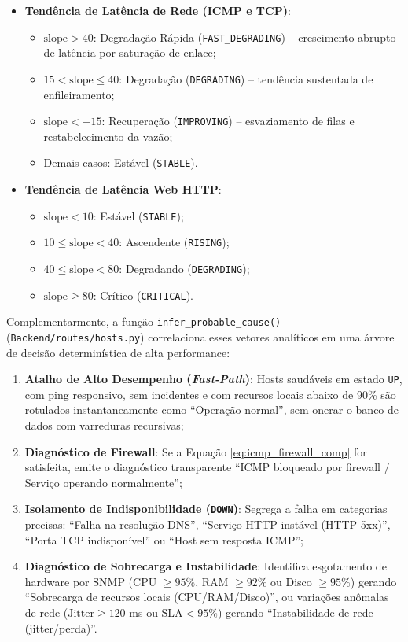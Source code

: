 \documentclass[12pt,a4paper]{article}
\begin{document}
\begin{itemize}[leftmargin=1.25cm]
\item \textbf{Tendência de Latência de Rede (ICMP e TCP)}:
  \begin{itemize}
  \item $\text{slope} > 40$: Degradação Rápida (\texttt{FAST\_DEGRADING}) -- crescimento abrupto de latência por saturação de enlace;
  \item $15 < \text{slope} \le 40$: Degradação (\texttt{DEGRADING}) -- tendência sustentada de enfileiramento;
  \item $\text{slope} < -15$: Recuperação (\texttt{IMPROVING}) -- esvaziamento de filas e restabelecimento da vazão;
  \item Demais casos: Estável (\texttt{STABLE}).
  \end{itemize}
\item \textbf{Tendência de Latência Web HTTP}:
  \begin{itemize}
  \item $\text{slope} < 10$: Estável (\texttt{STABLE});
  \item $10 \le \text{slope} < 40$: Ascendente (\texttt{RISING});
  \item $40 \le \text{slope} < 80$: Degradando (\texttt{DEGRADING});
  \item $\text{slope} \ge 80$: Crítico (\texttt{CRITICAL}).
  \end{itemize}
\end{itemize}

Complementarmente, a função \texttt{infer\_probable\_cause()} (\texttt{Backend/routes/hosts.py}) correlaciona esses vetores analíticos em uma árvore de decisão determinística de alta performance:
\begin{enumerate}[leftmargin=1.25cm]
\item \textbf{Atalho de Alto Desempenho (\textit{Fast-Path})}: Hosts saudáveis em estado \texttt{UP}, com ping responsivo, sem incidentes e com recursos locais abaixo de 90\% são rotulados instantaneamente como ``Operação normal'', sem onerar o banco de dados com varreduras recursivas;
\item \textbf{Diagnóstico de Firewall}: Se a Equação \ref{eq:icmp_firewall_comp} for satisfeita, emite o diagnóstico transparente ``ICMP bloqueado por firewall / Serviço operando normalmente'';
\item \textbf{Isolamento de Indisponibilidade (\texttt{DOWN})}: Segrega a falha em categorias precisas: ``Falha na resolução DNS'', ``Serviço HTTP instável (HTTP 5xx)'', ``Porta TCP indisponível'' ou ``Host sem resposta ICMP'';
\item \textbf{Diagnóstico de Sobrecarga e Instabilidade}: Identifica esgotamento de hardware por SNMP (CPU $\ge 95\%$, RAM $\ge 92\%$ ou Disco $\ge 95\%$) gerando ``Sobrecarga de recursos locais (CPU/RAM/Disco)'', ou variações anômalas de rede ($\text{Jitter} \ge 120$ ms ou $\text{SLA} < 95\%$) gerando ``Instabilidade de rede (jitter/perda)''.
\end{enumerate}
\end{document}
